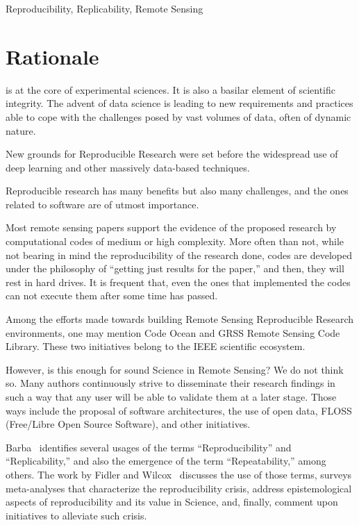 \documentclass[journal,twoside]{IEEEtran}
\begin{document}
\begin{IEEEkeywords}
	Reproducibility,
	Replicability,
	Remote Sensing
\end{IEEEkeywords}


\IEEEpeerreviewmaketitle

\section{Rationale}\label{Sec:Introduction}

 is at the core of experimental sciences. 
It is also a basilar element of scientific integrity. 
The advent of data science is leading to new requirements and practices able to cope with the challenges posed by vast volumes of data, often of dynamic nature. 

New grounds for Reproducible Research were set before the widespread use of deep learning and other massively data-based techniques.

Reproducible research has many benefits but also many challenges, and the ones related to software are of utmost importance.

Most remote sensing papers support the evidence of the proposed research by computational codes of medium or high complexity. 
More often than not, while not bearing in mind the reproducibility of the research done, codes are developed under the philosophy of ``getting just results for the paper,'' and then, they will rest in hard drives. 
It is frequent that, even the ones that implemented the codes can not execute them after some time has passed.  

Among the efforts made towards building Remote Sensing Reproducible Research environments, one may mention Code Ocean and GRSS Remote Sensing Code Library. 
These two initiatives belong to the IEEE scientific ecosystem. 

However, is this enough for sound Science in Remote Sensing? 
We do not think so. 
Many authors continuously strive to disseminate their research findings in such a way that any user will be able to validate them at a later stage. 
Those ways include the proposal of software architectures, the use of open data, FLOSS (Free/Libre Open Source Software), and other initiatives.

Barba~\cite{TerminologiesforReproducibleResearch} identifies several usages of the terms ``Reproducibility'' and ``Replicability,'' and also the emergence of the term ``Repeatability,'' among others.
The work by Fidler and Wilcox~\cite{ReproducibilityofScientificResults2018} discusses the use of those terms, surveys meta-analyses that characterize the reproducibility crisis, address epistemological aspects of reproducibility and its value in Science, and, finally, comment upon initiatives to alleviate such crisis.
\end{document}
